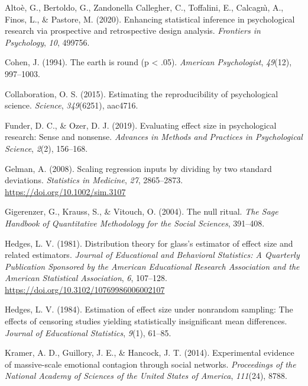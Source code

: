 \documentclass[
  man]{apa7}
\newlength{\cslhangindent}
\newlength{\cslentryspacingunit} %
\newenvironment{CSLReferences}[2] %
 {%
  \setlength{\parindent}{0pt}
  \ifodd #1
  \let\oldpar\par
  \def\par{\hangindent=\cslhangindent\oldpar}
  \fi
  \setlength{\parskip}{#2\cslentryspacingunit}
 }%
 {}
\begin{document}
\hypertarget{refs}{}
\begin{CSLReferences}{1}{0}
\leavevmode{}%
Altoè, G., Bertoldo, G., Zandonella Callegher, C., Toffalini, E., Calcagnı̀, A., Finos, L., \& Pastore, M. (2020). Enhancing statistical inference in psychological research via prospective and retrospective design analysis. \emph{Frontiers in Psychology}, \emph{10}, 499756.

\leavevmode{}%
Cohen, J. (1994). The earth is round (p \textless{} .05). \emph{American Psychologist}, \emph{49}(12), 997--1003.

\leavevmode{}%
Collaboration, O. S. (2015). Estimating the reproducibility of psychological science. \emph{Science}, \emph{349}(6251), aac4716.

\leavevmode{}%
Funder, D. C., \& Ozer, D. J. (2019). Evaluating effect size in psychological research: Sense and nonsense. \emph{Advances in Methods and Practices in Psychological Science}, \emph{2}(2), 156--168.

\leavevmode{}%
Gelman, A. (2008). Scaling regression inputs by dividing by two standard deviations. \emph{Statistics in Medicine}, \emph{27}, 2865--2873. \url{https://doi.org/10.1002/sim.3107}

\leavevmode{}%
Gigerenzer, G., Krauss, S., \& Vitouch, O. (2004). The null ritual. \emph{The Sage Handbook of Quantitative Methodology for the Social Sciences}, 391--408.

\leavevmode{}%
Hedges, L. V. (1981). Distribution theory for glass's estimator of effect size and related estimators. \emph{Journal of Educational and Behavioral Statistics: A Quarterly Publication Sponsored by the American Educational Research Association and the American Statistical Association}, \emph{6}, 107--128. \url{https://doi.org/10.3102/10769986006002107}

\leavevmode{}%
Hedges, L. V. (1984). Estimation of effect size under nonrandom sampling: The effects of censoring studies yielding statistically insignificant mean differences. \emph{Journal of Educational Statistics}, \emph{9}(1), 61--85.

\leavevmode{}%
Kramer, A. D., Guillory, J. E., \& Hancock, J. T. (2014). Experimental evidence of massive-scale emotional contagion through social networks. \emph{Proceedings of the National Academy of Sciences of the United States of America}, \emph{111}(24), 8788.


\end{CSLReferences}
\end{document}
